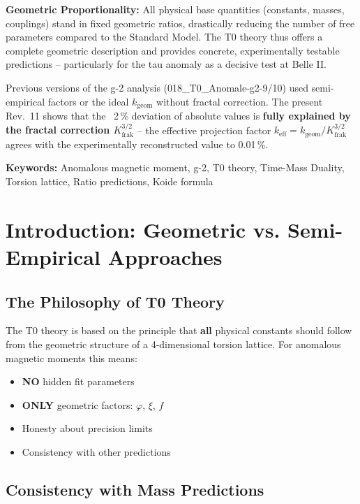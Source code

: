 		\textbf{Geometric Proportionality:} All physical base quantities (constants, masses, couplings) stand in fixed geometric ratios, drastically reducing the number of free parameters compared to the Standard Model. The T0 theory thus offers a complete geometric description and provides concrete, experimentally testable predictions – particularly for the tau anomaly as a decisive test at Belle II.

	
	\begin{tcolorbox}[colback=yellow!10!white, colframe=orange!75!black, title=Note on Older Documents]
		Previous versions of the g-2 analysis (018\_T0\_Anomale-g2-9/10) used semi-empirical factors or the ideal $k_\text{geom}$ without fractal correction. The present Rev.~11 shows that the ~2\,\% deviation of absolute values is \textbf{fully explained by the fractal correction $K_\text{frak}^{3/2}$} -- the effective projection factor $k_\text{eff} = k_\text{geom}/K_\text{frak}^{3/2}$ agrees with the experimentally reconstructed value to 0.01\,\%.
	\end{tcolorbox}
	
	\textbf{Keywords:} Anomalous magnetic moment, g-2, T0 theory, Time-Mass Duality, Torsion lattice, Ratio predictions, Koide formula
	
	
	\section{Introduction: Geometric vs. Semi-Empirical Approaches}
	
	\subsection{The Philosophy of T0 Theory}
	
	The T0 theory is based on the principle that \textbf{all} physical constants should follow from the geometric structure of a 4-dimensional torsion lattice. For anomalous magnetic moments this means:
	
	\begin{itemize}
		\item \textbf{NO} hidden fit parameters
		\item \textbf{ONLY} geometric factors: $\varphi$, $\xi$, $f$
		\item Honesty about precision limits
		\item Consistency with other predictions
	\end{itemize}
	
	\subsection{Consistency with Mass Predictions}
	
